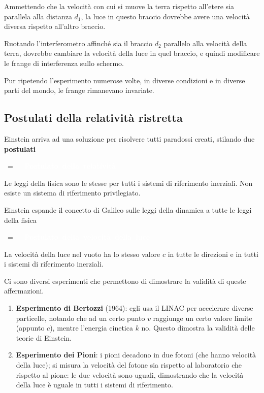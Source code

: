 \documentclass[a4paper, oneside]{article}
\makeatletter
\newlength\sidebar
\newlength\envborder
\def\esefcolorbox#1#{\esecolor@fbox{#1}}
\def\esecolor@fbox#1#2#3{%
		  \color@b@x{\fboxsep\z@\color#1{#2}\fboxs}{\color#1{#3}}}
\newenvironment{eseframed}{%
		  \def\FrameCommand{\fboxrule=\the\sidebar  \fboxsep=\the\envborder%
		  \esefcolorbox{exampleborder}{examplebg}}%
		  \MakeFramed{\FrameRestore}}%
		 {\endMakeFramed}
\newenvironment{nota}[1]
		{\par\medskip%
		\hbox{%
		\fboxsep=\the\sidebar\hspace{-\envborder}\hspace{-.5\sidebar}%
		\colorbox{exampleborder}{%
		\hspace{\envborder}\footnotesize\sffamily\bfseries%
		\textcolor{white}{{{\large
		#1}}\hspace{\envborder}}
		}
		}
		\nointerlineskip\vspace{-\topsep}%
		\begin{eseframed}\noindent\ignorespaces%
		}
		{\end{eseframed}\vspace{-\baselineskip}\medskip}
\newcounter{i}%
\newcounter{n}%
\newcounter{I}%
\makeatother
\begin{document}
Ammettendo che la velocità con cui si muove la terra rispetto all'etere sia parallela alla distanza $d_1$, la luce in questo braccio dovrebbe avere una velocità diversa rispetto all'altro braccio.

Ruotando l'interferometro affinché sia il braccio $d_2$ parallelo alla velocità della terra, dovrebbe cambiare la velocità della luce in quel braccio, e quindi modificare le frange di interferenza sullo schermo.

Pur ripetendo l'esperimento numerose volte, in diverse condizioni e in diverse parti del mondo, le frange rimanevano invariate.

\subsection{Postulati della relatività ristretta}

Einstein arriva ad una soluzione per risolvere tutti paradossi creati, stilando due \textbf{postulati}

\begin{nota}{Postulato della relatività}
Le leggi della fisica sono le stesse per tutti i sistemi di riferimento inerziali. Non esiste un sistema di riferimento privilegiato.
\end{nota}

Einstein espande il concetto di Galileo sulle leggi della dinamica a tutte le leggi della fisica

\begin{nota}{Postulato della velocità della luce}
La velocità della luce nel vuoto ha lo stesso valore $c$ in tutte le direzioni e in tutti i sistemi di riferimento inerziali.
\end{nota}

Ci sono diversi esperimenti che permettono di dimostrare la validità di queste affermazioni.
\begin{enumerate}
\item \textbf{Esperimento di Bertozzi} (1964): egli usa il LINAC per accelerare diverse particelle, notando che ad un certo punto $v$ raggiunge un certo valore limite (appunto $c$), mentre l'energia cinetica $k$ no. Questo dimostra la validità delle teorie di Einstein.
\item \textbf{Esperimento dei Pioni}: i pioni decadono in due fotoni (che hanno velocità della luce); si misura la velocità del fotone sia rispetto al laboratorio che rispetto al pione: le due velocità sono uguali, dimostrando che la velocità della luce è uguale in tutti i sistemi di riferimento.
\end{enumerate}
\end{document}
